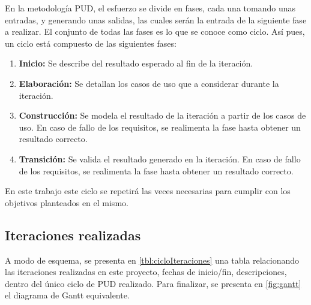 En la metodología PUD, el esfuerzo se divide en fases, cada una tomando unas entradas, y generando unas salidas, las cuales serán la entrada de la siguiente fase a realizar. El conjunto de todas las fases es lo que se conoce como ciclo. Así pues, un ciclo está compuesto de las siguientes fases:

\begin{enumerate}
    \item \textbf{Inicio:} Se describe del resultado esperado al fin de la iteración.
    \item \textbf{Elaboración:} Se detallan los casos de uso que a considerar durante la iteración.
    \item \textbf{Construcción:} Se modela el resultado de la iteración a partir de los casos de uso. En caso de fallo de los requisitos, se realimenta la fase hasta obtener un resultado correcto.
    \item \textbf{Transición:} Se valida el resultado generado en la iteración. En caso de fallo de los requisitos, se realimenta la fase hasta obtener un resultado correcto.
\end{enumerate}

En este trabajo este ciclo se repetirá las veces necesarias para cumplir con los objetivos planteados en el mismo.

\subsection{Iteraciones realizadas}
A modo de esquema, se presenta en \ref{tbl:cicloIteraciones} una tabla relacionando las iteraciones realizadas en este proyecto, fechas de inicio/fin, descripciones, dentro del único ciclo de PUD realizado. Para finalizar, se presenta en \ref{fig:gantt} el diagrama de Gantt equivalente.

